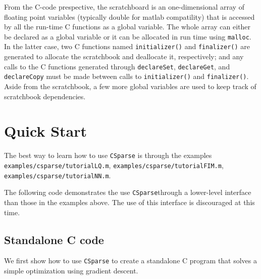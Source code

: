 \documentclass[11pt]{article}
\newcommand{\CS}{\texttt{CSparse}}
\begin{document}
From the C-code prespective, the scratchboard is an one-dimensional
array of floating point variables (typically double for matlab
compatility) that is accessed by all the run-time C functions as a
global variable. The whole array can either be declared as a global
variable or it can be allocated in run time using
\lstinline{malloc}. In the latter case, two C functions named
\lstinline{initializer()} and \lstinline{finalizer()} are generated to
allocate the scratchbook and deallocate it, respectively; and any
calls to the C functions generated through \lstinline{declareSet},
\lstinline{declareGet}, and \lstinline{declareCopy} must be made
between calls to \lstinline{initializer()} and
\lstinline{finalizer()}. Aside from the scratchbook, a few more global
variables are used to keep track of scratchbook dependencies.


\newpage

\section{Quick Start}

The best way to learn how to use \CS{} is through the examples
\lstinline{examples/csparse/tutorialLQ.m},
\lstinline{examples/csparse/tutorialFIM.m}, \lstinline{examples/csparse/tutorialNN.m}.  

\medskip

The following code demonstrates the use \CS through a lower-level
interface than those in the examples above. The use of this interface
is discouraged at this time.

\subsection{Standalone C code}

We first show how to use \CS{} to create a standalone C program that
solves a simple optimization using gradient descent.

\medskip
\end{document}
